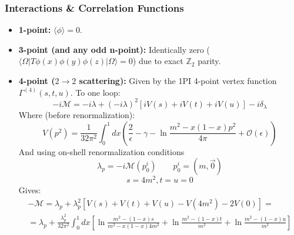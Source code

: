 \documentclass{article}
\begin{document}
\subsubsection*{Interactions \& Correlation Functions}
\begin{itemize}
    \item \textbf{1-point:} $\langle \phi \rangle = 0$.
    \item \textbf{3-point (and any odd n-point):} Identically zero ($\langle \Omega | T\phi(x)\phi(y)\phi(z) | \Omega \rangle = 0$) due to exact $\mathbb{Z}_2$ parity.
    \item \textbf{4-point ($2 \to 2$ scattering):} Given by the 1PI 4-point vertex function $\Gamma^{(4)}(s, t, u)$. To one loop:
    \begin{equation}
        -i\mathcal{M} = -i\lambda + (-i\lambda)^2 [ iV(s) + iV(t) + iV(u) ] - i\delta_\lambda
    \end{equation}
    Where (before renormalization):
    \begin{equation}
        V(p^2) = \frac{1}{32\pi^2} \int_0^1 dx \left(
            \frac{2}{\epsilon} - \gamma - \ln\frac{m^2 - x(1-x)p^2}{4\pi} + \mathcal{O}(\epsilon)
        \right)
    \end{equation}
    And using on-shell renormalization conditions
    \begin{equation}
        \lambda_p = -i\mathcal{M}(p^i_0) \qquad p^i_0 = (m, \vec{0})
    \end{equation}
    \begin{equation}
        s = 4m^2, t = u = 0
    \end{equation}
    Gives:
    \begin{equation}
    \begin{gathered}
        -\mathcal{M} = \lambda_p + \lambda_p^2\left[V(s) + V(t) + V(u) - V(4m^2) - 2V(0)\right] = \\ =
        \lambda_p + \frac{\lambda_p^2}{32\pi^2}\int_0^1 dx\left[
            \ln\frac{m^2 - (1-x)s}{m^2 - x(1-x)4m^2} +
            \ln\frac{m^2 - (1-x)t}{m^2} +
            \ln\frac{m^2 - (1-x)u}{m^2}
        \right]
    \end{gathered}
    \end{equation}
\end{itemize}
\end{document}
